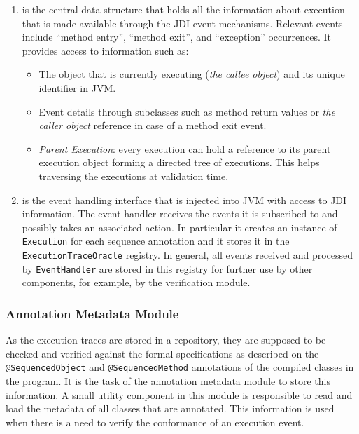\begin{enumerate}
  \item {} is the central data structure that holds all the
  information about execution that is made available through the JDI event mechanisms.
  Relevant events include ``method entry'', ``method  exit'', and
``exception'' occurrences.
   It provides access to information such as:
   \begin{itemize}
     \item The object that is currently executing (\emph{the callee object}) and
     its unique identifier in JVM.
     \item Event details through subclasses such as method return values or
     \emph{the caller object} reference in case of a method exit event.
     \item \textit{Parent Execution}: every execution can hold a reference to its
     parent execution object forming a directed tree of executions. This helps
     traversing the executions at validation time.
    \end{itemize}
     \item {} is the event handling interface that
is
     injected into JVM with access to JDI information. The event handler
     receives the events it is subscribed to and possibly takes an associated
     action. In particular it creates an instance of {\small\texttt{Execution}}
     for each sequence annotation and it stores it in the
     {\small\texttt{ExecutionTraceOracle}} registry. In general, all events received and processed by
     {\small\texttt{EventHandler}} are stored in this registry for further use
     by other components, for example, by the
     verification module.
\end{enumerate}

\subsubsection{Annotation Metadata Module} \label{ch05:sec:annotation_repo}

As the execution traces are stored in a repository, they are supposed to be
checked and verified against the formal specifications as described on the
{\small\texttt{@SequencedObject}} and {\small\texttt{@SequencedMethod}} annotations
of the compiled classes in the program. It is the task of the
annotation metadata module to store this information. A small utility
component in this module is responsible to read and load the metadata of all
classes that are annotated. This information is used when there is a
need to verify the conformance of an execution event.


